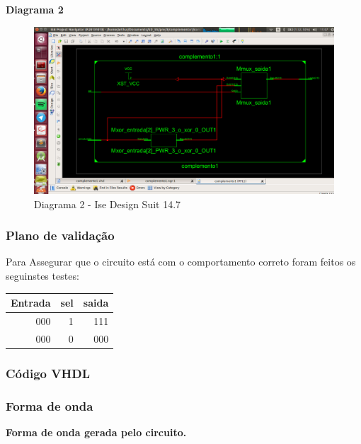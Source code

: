 \documentclass[12pts]{article}
\begin{document}
\newpage
\textbf{Diagrama 2 }

\begin{figure}[!htb]
  \centering
  \includegraphics[scale=0.3	]{imagens/complementoSc2}
  \caption{Diagrama 2 - Ise Design Suit 14.7}
  \label{figRotulo}
\end{figure}


\subsubsection{Plano de validação}

Para Assegurar que o circuito está com o comportamento correto foram feitos os seguinstes testes:

\begin{center}
	\begin{tabular}{|r|r|r|}
		\hline
		Entrada & sel & saida \\
		\hline
		000 & 1 & 111 \\
		\hline
		000 & 0 & 000 \\
		\hline
	\end{tabular}
\end{center}

\newpage
\subsubsection{Código VHDL}



\newpage
\subsubsection{Forma de onda}

\textbf{Forma de onda gerada pelo circuito.}
\end{document}
